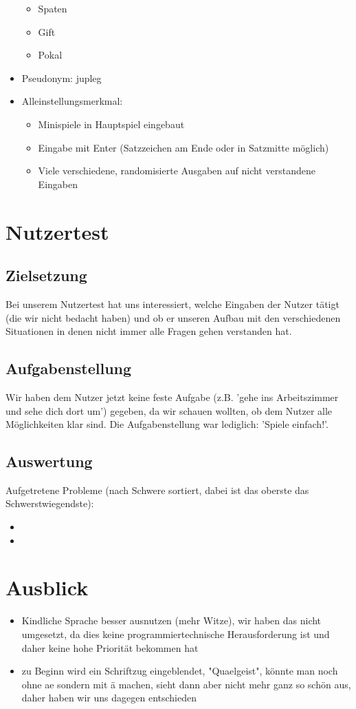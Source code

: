 \documentclass[10pt,a4paper]{article}
\begin{document}
\begin{itemize}
\begin{itemize}
\item Spaten
\item Gift
\item Pokal
\end{itemize}
\item Pseudonym: jupleg
\item Alleinstellungsmerkmal:
\begin{itemize}
\item Minispiele in Hauptspiel eingebaut
\item Eingabe mit Enter (Satzzeichen am Ende oder in Satzmitte möglich)
\item Viele verschiedene, randomisierte Ausgaben auf nicht verstandene Eingaben
\end{itemize}
\end{itemize}

\section*{Nutzertest}
\subsection*{Zielsetzung}
Bei unserem Nutzertest hat uns interessiert, welche Eingaben der Nutzer tätigt (die wir nicht bedacht haben) und ob er unseren Aufbau mit den verschiedenen Situationen in denen nicht immer alle Fragen gehen verstanden hat. 
\subsection*{Aufgabenstellung}
Wir haben dem Nutzer jetzt keine feste Aufgabe (z.B. 'gehe ins Arbeitszimmer und sehe dich dort um') gegeben, da wir schauen wollten, ob dem Nutzer alle Möglichkeiten klar sind. Die Aufgabenstellung war lediglich: 'Spiele einfach!'. 
\subsection*{Auswertung}
Aufgetretene Probleme (nach Schwere sortiert, dabei ist das oberste das Schwerstwiegendste):
\begin{itemize}
\item
\item
\end{itemize}

\section*{Ausblick}
\begin{itemize}
\item Kindliche Sprache besser ausnutzen (mehr Witze), wir haben das nicht umgesetzt, da dies keine programmiertechnische Herausforderung ist und daher keine hohe Priorität bekommen hat
\item zu Beginn wird ein Schriftzug eingeblendet, "Quaelgeist", könnte man noch ohne ae sondern mit ä machen, sieht dann aber nicht mehr ganz so schön aus, daher haben wir uns dagegen entschieden
\end{itemize}
\end{document}
